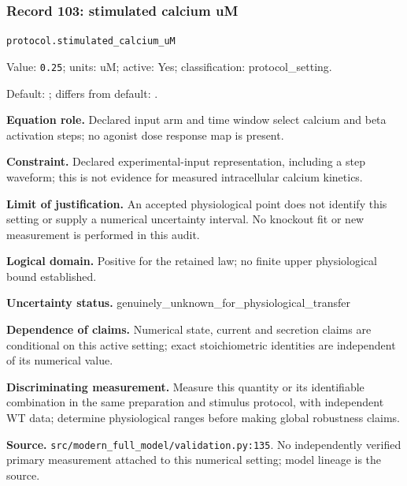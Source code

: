 \subsubsection*{Record 103: stimulated calcium uM}
{\small \nolinkurl{protocol.stimulated_calcium_uM}\par

Value: \texttt{0.25}; units: uM; active: Yes; classification: protocol\_setting.\par

Default: ; differs from default: .\par

\textbf{Equation role.} Declared input arm and time window select calcium and beta activation steps; no agonist dose response map is present.\par

\textbf{Constraint.} Declared experimental-input representation, including a step waveform; this is not evidence for measured intracellular calcium kinetics.\par

\textbf{Limit of justification.} An accepted physiological point does not identify this setting or supply a numerical uncertainty interval. No knockout fit or new measurement is performed in this audit.\par

\textbf{Logical domain.} Positive for the retained law; no finite upper physiological bound established.\par

\textbf{Uncertainty status.} genuinely\_unknown\_for\_physiological\_transfer\par

\textbf{Dependence of claims.} Numerical state, current and secretion claims are conditional on this active setting; exact stoichiometric identities are independent of its numerical value.\par

\textbf{Discriminating measurement.} Measure this quantity or its identifiable combination in the same preparation and stimulus protocol, with independent WT data; determine physiological ranges before making global robustness claims.\par

\textbf{Source.} \nolinkurl{src/modern_full_model/validation.py:135}. No independently verified primary measurement attached to this numerical setting; model lineage is the source.\par}


